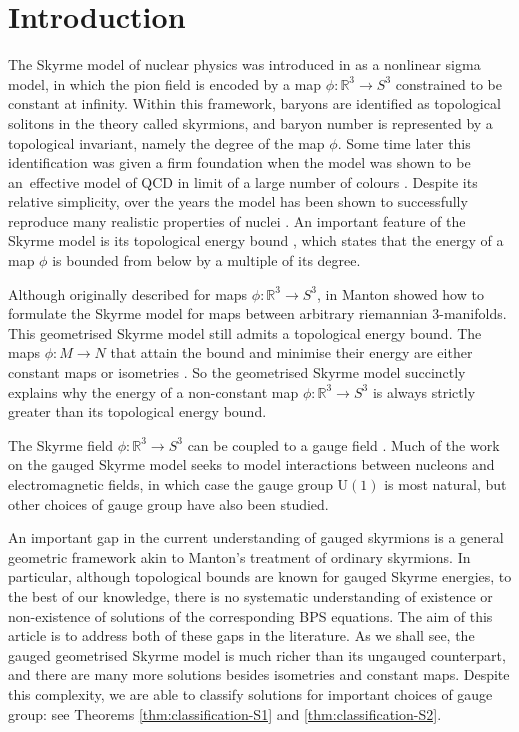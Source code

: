 \documentclass[pdftex]{sigma}
\newcommand{\U}{{\mathrm{U}}}
\newcommand{\R}{{\mathbb{R}}}
\newcommand{\1}{{\mathbb{1}}}
\numberwithin{equation}{section}
\begin{document}
\section{Introduction}
The Skyrme model of nuclear physics was introduced in \cite{skyrme1962nucl} as a nonlinear sigma model, in which the pion field is encoded by a map $\phi\colon \R^3\to S^3$ constrained to be constant at infinity. Within this framework, baryons are identified as topological solitons in the theory called skyrmions, and baryon number is represented by a topological invariant, namely the degree of the map $\phi$. Some time later this identification was given a firm foundation when the model was shown to be an~effective model of QCD in limit of a large number of colours \cite{witten1979baryons}. Despite its relative simplicity, over the years the model has been shown to successfully reproduce many realistic properties of nuclei \cite{manton2022skyrmions:theory}. An important feature of the Skyrme model is its topological energy bound \cite{faddeev1976some}, which states that the energy of a map $\phi$ is bounded from below by a multiple of its degree.

Although originally described for maps $\phi\colon \R^3\to S^3$, in \cite{Manton1987geometry} Manton showed how to formulate the Skyrme model for maps between arbitrary riemannian $3$-manifolds. This geometrised Skyrme model still admits a topological energy bound. The maps $\phi\colon M\to N$ that attain the bound and minimise their energy are either constant maps or isometries \cite{Manton1987geometry}. So the geometrised Skyrme model succinctly explains why the energy of a non-constant map $\phi\colon \R^3\to S^3$ is always strictly greater than its topological energy bound.

The Skyrme field $\phi\colon \R^3\to S^3$ can be coupled to a gauge field \cite{ArthurTchrakian1996GaugedSky,
BrihayeHartmannTchhrakian2001MonopolesGaugeSky, CallanWitten1984monopole,cork2018skyrmions,
CorkHarlandWinyard2021gaugedskyrmelowbinding,
criadoKhozeSpannowsky2021emergence,dHokerFarhi1984decoupling,LivramentoRaduShnir2023solitons,navarroLRaduTchrakian2019topological,
PietteTchrakian2000static,RaduTchrakian2006spinning}. Much of the work on the gauged Skyrme model seeks to model interactions between nucleons and electromagnetic fields, in which case the gauge group $\U(1)$ is most natural, but other choices of gauge group have also been studied.

An important gap in the current understanding of gauged skyrmions is a general geometric framework akin to Manton's treatment of ordinary skyrmions. In particular, although topological bounds are known for gauged Skyrme energies, to the best of our knowledge, there is no systematic understanding of existence or non-existence of solutions of the corresponding BPS equations. The aim of this article is to address both of these gaps in the literature. As we shall see, the gauged geometrised Skyrme model is much richer than its ungauged counterpart, and there are many more solutions besides isometries and constant maps. Despite this complexity, we are able to classify solutions for important choices of gauge group: see Theorems \ref{thm:classification-S1} and \ref{thm:classification-S2}.
\end{document}
